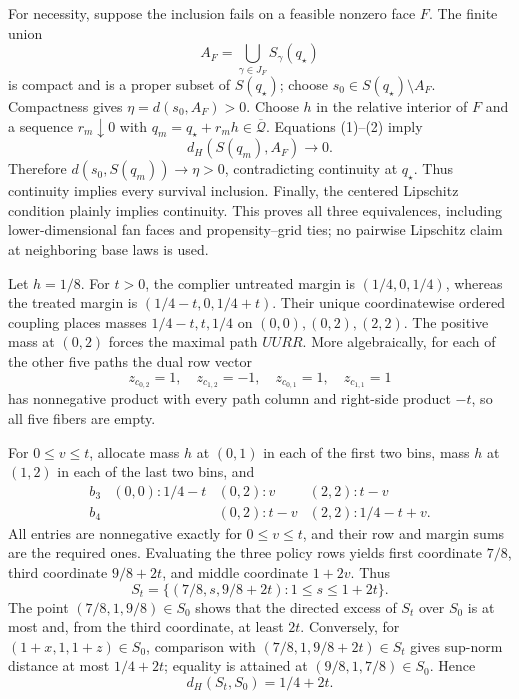 For necessity, suppose the inclusion fails on a feasible nonzero face \(F\).  The finite union
\[
A_F=\bigcup_{\gamma\in J_F}S_\gamma(q_\star)
\]
is compact and is a proper subset of \(S(q_\star)\); choose \(s_0\in S(q_\star)\setminus A_F\).  Compactness gives \(\eta=d(s_0,A_F)>0\).  Choose \(h\) in the relative interior of \(F\) and a sequence \(r_m\downarrow0\) with \(q_m=q_\star+r_mh\in\overline{\mathcal Q}\).  Equations (1)--(2) imply
\[
d_H\!\left(S(q_m),A_F\right)\longrightarrow0.
\]
Therefore \(d(s_0,S(q_m))\to\eta>0\), contradicting continuity at \(q_\star\).  Thus continuity implies every survival inclusion.  Finally, the centered Lipschitz condition plainly implies continuity.  This proves all three equivalences, including lower-dimensional fan faces and propensity--grid ties; no pairwise Lipschitz claim at neighboring base laws is used.

Let \(h=1/8\).  For \(t>0\), the complier untreated margin is \((1/4,0,1/4)\), whereas the treated margin is \((1/4-t,0,1/4+t)\).  Their unique coordinatewise ordered coupling places masses \(1/4-t,t,1/4\) on \((0,0),(0,2),(2,2)\).  The positive mass at \((0,2)\) forces the maximal path \(UURR\).  More algebraically, for each of the other five paths the dual row vector
\[
z_{c_{0,2}}=1,\quad z_{c_{1,2}}=-1,\quad
z_{c_{0,1}}=1,\quad z_{c_{1,1}}=1
\]
has nonnegative product with every path column and right-side product \(-t\), so all five fibers are empty.

For \(0\le v\le t\), allocate mass \(h\) at \((0,1)\) in each of the first two bins, mass \(h\) at \((1,2)\) in each of the last two bins, and
\[
\begin{array}{c|lll}
b_3&(0,0):1/4-t&(0,2):v&(2,2):t-v\\
b_4&&(0,2):t-v&(2,2):1/4-t+v.
\end{array}
\]
All entries are nonnegative exactly for \(0\le v\le t\), and their row and margin sums are the required ones.  Evaluating the three policy rows yields first coordinate \(7/8\), third coordinate \(9/8+2t\), and middle coordinate \(1+2v\).  Thus
\[
S_t=\{(7/8,s,9/8+2t):1\le s\le1+2t\}.
\]
The point \((7/8,1,9/8)\in S_0\) shows that the directed excess of \(S_t\) over \(S_0\) is at most and, from the third coordinate, at least \(2t\).  Conversely, for \((1+x,1,1+z)\in S_0\), comparison with \((7/8,1,9/8+2t)\in S_t\) gives sup-norm distance at most \(1/4+2t\); equality is attained at \((9/8,1,7/8)\in S_0\).  Hence
\[
d_H(S_t,S_0)=1/4+2t.
\]

